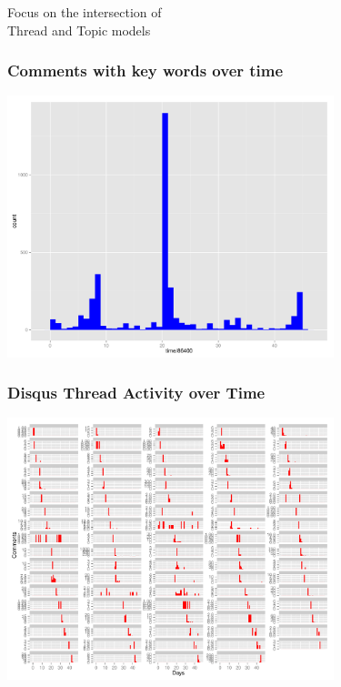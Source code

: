 \documentclass{beamer}
\begin{document}
\begin{frame}
\begin{center}
{\Huge Focus on the intersection of \\[15 pt] Thread and Topic models}
\end{center}
\end{frame}

\begin{frame}\frametitle{Comments with key words over time}
  \begin{center}
    \includegraphics[width=9.5cm]{./imgs/time.pdf}
  \end{center}
\end{frame}

\begin{frame}\frametitle{Disqus Thread Activity over Time}
  \begin{center}
    \includegraphics[width=9.5cm]{./imgs/timebythread.pdf}
  \end{center}
\end{frame}
\end{document}
